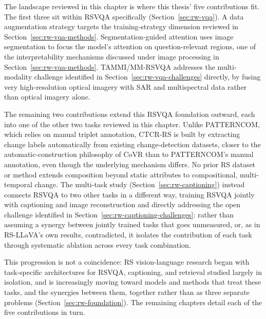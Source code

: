 The landscape reviewed in this chapter is where this thesis' five contributions fit. The first three sit within RSVQA specifically (Section~\ref{sec:rw-vqa}). A data augmentation strategy targets the training-strategy dimension reviewed in Section~\ref{sec:rw-vqa-methods}. Segmentation-guided attention uses image segmentation to focus the model's attention on question-relevant regions, one of the interpretability mechanisms discussed under image processing in Section~\ref{sec:rw-vqa-methods}. TAMMI/MM-RSVQA addresses the multi-modality challenge identified in Section~\ref{sec:rw-vqa-challenges} directly, by fusing very high-resolution optical imagery with SAR and multispectral data rather than optical imagery alone.

The remaining two contributions extend this RSVQA foundation outward, each into one of the other two tasks reviewed in this chapter. Unlike PATTERNCOM, which relies on manual triplet annotation, CTCR-RS is built by extracting change labels automatically from existing change-detection datasets, closer to the automatic-construction philosophy of CoVR than to PATTERNCOM's manual annotation, even though the underlying mechanism differs. No prior RS dataset or method extends composition beyond static attributes to compositional, multi-temporal change. The multi-task study (Section~\ref{sec:rw-captioning}) instead connects RSVQA to two other tasks in a different way, training RSVQA jointly with captioning and image reconstruction and directly addressing the open challenge identified in Section~\ref{sec:rw-captioning-challenges}: rather than assuming a synergy between jointly trained tasks that goes unmeasured, or, as in RS-LLaVA's own results, contradicted, it isolates the contribution of each task through systematic ablation across every task combination.
 
This progression is not a coincidence: RS vision-language research began with  task-specific architectures for RSVQA, captioning, and retrieval studied largely in isolation, and is increasingly moving toward models and methods that treat these tasks, and the synergies between them, together rather than as three separate problems (Section~\ref{sec:rw-foundation}). The remaining chapters detail each of the five contributions in turn.